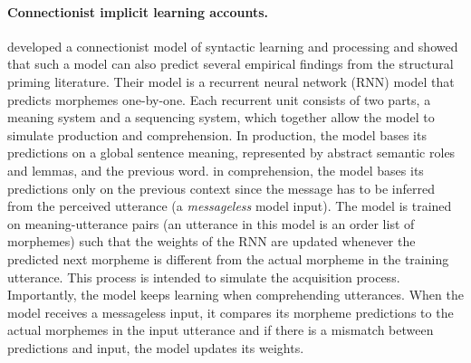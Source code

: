 

















\paragraph{Connectionist implicit learning accounts.} \textcite{Chang2006} developed a connectionist model of syntactic learning and processing and showed
that such a model can also predict several empirical findings from the structural priming literature. Their model is a recurrent neural network (RNN)
model \cite{Elman1990} that predicts morphemes one-by-one. Each recurrent unit consists of two parts, a meaning system and a sequencing system, 
which together allow the model to simulate production and comprehension. In production, the model bases
its predictions on a global sentence meaning, represented by abstract semantic roles and lemmas, and the previous word. in comprehension, the model 
bases its predictions only on the previous context since the message has to be inferred from the perceived utterance (a \textit{messageless} model input). 
The model is trained on meaning-utterance pairs (an utterance in this model is an order list of morphemes) such that the weights of the RNN are updated 
whenever the predicted next morpheme is different from the actual morpheme in the training utterance. This process is intended to simulate the acquisition process.
Importantly, the model keeps learning when comprehending utterances. When the model receives a messageless input, it compares its morpheme predictions
to the actual morphemes in the input utterance and if there is a mismatch between predictions and input, the model updates its weights.


